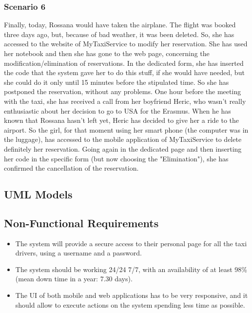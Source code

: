 		\subsubsection{Scenario 6}
		Finally, today, Rossana would have taken the airplane. The flight was booked three days ago, but, because of bad weather, it was been deleted. So, she has accessed to the website of MyTaxiService to modify her reservation. She has used her notebook and then she has gone to the web page, concerning the modification/elimination of reservations. In the dedicated form, she has inserted the code that the system gave her to do this stuff, if she would have needed, but she could do it only until 15 minutes before the stipulated time. So she has postponed the reservation, without any problems.
		One hour before the meeting with the taxi, she has received a call from her boyfriend Heric, who wasn't really enthusiastic about her decision to go to USA for the Erasmus. When he has known that Rossana hasn't left yet, Heric has decided to give her a ride to the airport. So the girl, for that moment using her smart phone (the computer was in the luggage), has accessed to the mobile application of MyTaxiService to delete definitely her reservation. Going again in the dedicated page and then inserting her code in the specific form (but now choosing the "Elimination"), she has confirmed the cancellation of the reservation. 
	\newpage
	\subsection{UML Models}
		
		\newpage
		
		\newpage
		
		
	\subsection{Non-Functional Requirements}
		\begin{itemize}
		\item The system will provide a secure access to their personal page for all the taxi drivers, using a username and a password.
		\item The system should be working 24/24 7/7, with an availability of at least 98\% (mean down time in a year: 7.30 days).
		\item The UI of both mobile and web applications has to be very responsive, and it should allow to execute actions on the system spending less time as possible.
		\end{itemize}
